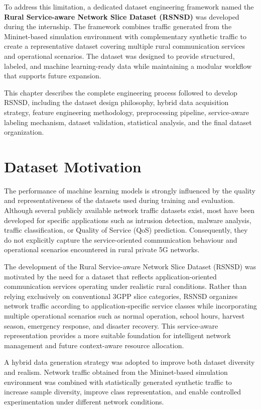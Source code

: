 \documentclass[12pt,a4paper]{report}
\begin{document}
	To address this limitation, a dedicated dataset engineering framework named the \textbf{Rural Service-aware Network Slice Dataset (RSNSD)} was developed during the internship. The framework combines traffic generated from the Mininet-based simulation environment with complementary synthetic traffic to create a representative dataset covering multiple rural communication services and operational scenarios. The dataset was designed to provide structured, labeled, and machine learning-ready data while maintaining a modular workflow that supports future expansion.
	
	This chapter describes the complete engineering process followed to develop RSNSD, including the dataset design philosophy, hybrid data acquisition strategy, feature engineering methodology, preprocessing pipeline, service-aware labeling mechanism, dataset validation, statistical analysis, and the final dataset organization.
	
	\section{Dataset Motivation}
	\label{sec:dataset_motivation}
	
	The performance of machine learning models is strongly influenced by the quality and representativeness of the datasets used during training and evaluation. Although several publicly available network traffic datasets exist, most have been developed for specific applications such as intrusion detection, malware analysis, traffic classification, or Quality of Service (QoS) prediction. Consequently, they do not explicitly capture the service-oriented communication behaviour and operational scenarios encountered in rural private 5G networks.
	
	The development of the Rural Service-aware Network Slice Dataset (RSNSD) was motivated by the need for a dataset that reflects application-oriented communication services operating under realistic rural conditions. Rather than relying exclusively on conventional 3GPP slice categories, RSNSD organizes network traffic according to application-specific service classes while incorporating multiple operational scenarios such as normal operation, school hours, harvest season, emergency response, and disaster recovery. This service-aware representation provides a more suitable foundation for intelligent network management and future context-aware resource allocation.
	
	A hybrid data generation strategy was adopted to improve both dataset diversity and realism. Network traffic obtained from the Mininet-based simulation environment was combined with statistically generated synthetic traffic to increase sample diversity, improve class representation, and enable controlled experimentation under different network conditions.
	
\end{document}

